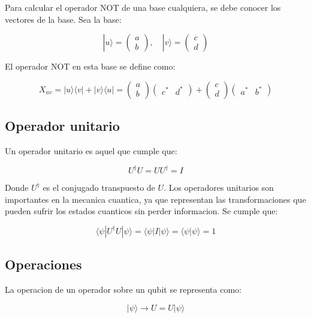 \documentclass[11pt]{article}
\begin{document}
Para calcular el operador NOT de una base cualquiera, se debe conocer los vectores de la base. Sea la base:

\begin{equation}
    |u\rangle = \begin{pmatrix} a \\ b \end{pmatrix}, \quad |v\rangle = \begin{pmatrix} c \\ d \end{pmatrix}
\end{equation}

El operador NOT en esta base se define como:

\begin{equation}
    X_{uv} = |u\rangle \langle v| + |v\rangle \langle u| = \begin{pmatrix} a \\ b \end{pmatrix} \begin{pmatrix} c^* & d^* \end{pmatrix} + \begin{pmatrix} c \\ d \end{pmatrix} \begin{pmatrix} a^* & b^* \end{pmatrix}
\end{equation}

\subsection{Operador unitario}

Un operador unitario es aquel que cumple que:

\begin{equation}
    U^\dagger U = U U^\dagger = I
\end{equation}

Donde $U^\dagger$ es el conjugado transpuesto de $U$. Los operadores unitarios son importantes en la mecanica cuantica, ya que representan las transformaciones que pueden sufrir los estados cuanticos sin perder informacion. Se cumple que:

\begin{equation}
    \langle \psi | U^\dagger U | \psi \rangle = \langle \psi | I | \psi \rangle = \langle \psi | \psi \rangle = 1
\end{equation}

\subsection{Operaciones}

La operacion de un operador sobre un qubit se representa como:

\begin{equation}
    |\psi\rangle \rightarrow U = U |\psi\rangle
\end{equation}
\end{document}
